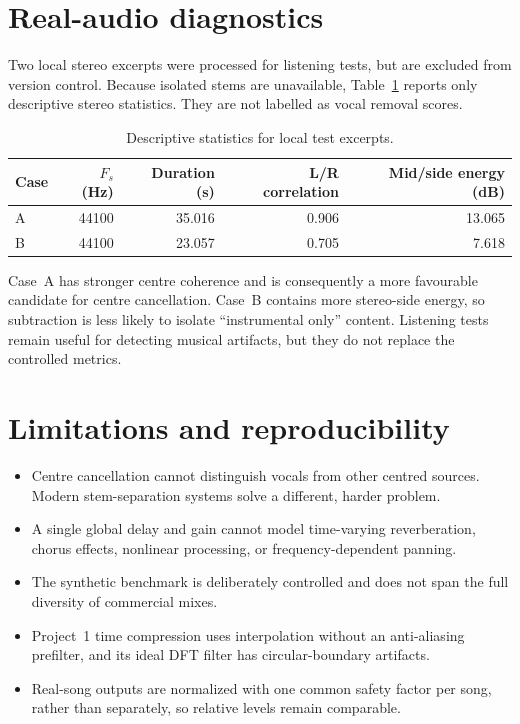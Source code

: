 \documentclass[11pt,a4paper]{article}
\begin{document}
\section{Real-audio diagnostics}

Two local stereo excerpts were processed for listening tests, but are excluded
from version control. Because isolated stems are unavailable, Table~\ref{tab:real}
reports only descriptive stereo statistics. They are not labelled as vocal
removal scores.

\begin{table}[H]
  \centering
  \caption{Descriptive statistics for local test excerpts.}
  \label{tab:real}
  \begin{tabular}{lrrrr}
    \toprule
    Case & $F_s$ (Hz) & Duration (s) & L/R correlation & Mid/side energy (dB)\\
    \midrule
    A & 44100 & 35.016 & 0.906 & 13.065\\
    B & 44100 & 23.057 & 0.705 & 7.618\\
    \bottomrule
  \end{tabular}
\end{table}

Case~A has stronger centre coherence and is consequently a more favourable
candidate for centre cancellation. Case~B contains more stereo-side energy, so
subtraction is less likely to isolate ``instrumental only'' content. Listening
tests remain useful for detecting musical artifacts, but they do not replace
the controlled metrics.

\section{Limitations and reproducibility}

\begin{itemize}
  \item Centre cancellation cannot distinguish vocals from other centred
  sources. Modern stem-separation systems solve a different, harder problem.
  \item A single global delay and gain cannot model time-varying reverberation,
  chorus effects, nonlinear processing, or frequency-dependent panning.
  \item The synthetic benchmark is deliberately controlled and does not span
  the full diversity of commercial mixes.
  \item Project~1 time compression uses interpolation without an anti-aliasing
  prefilter, and its ideal DFT filter has circular-boundary artifacts.
  \item Real-song outputs are normalized with one common safety factor per song,
  rather than separately, so relative levels remain comparable.
\end{itemize}
\end{document}
